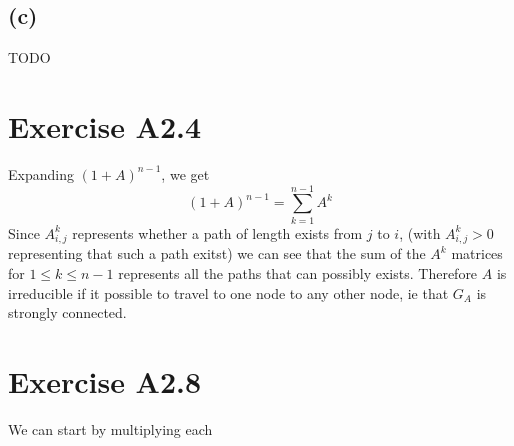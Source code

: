 \subsection*{(c)}
TODO
\section*{Exercise A2.4}
Expanding $(1+A)^{n-1}$, we get
$$
(1+A)^{n-1}=\sum_{k=1}^{n-1}A^k$$
Since $A^k_{i,j}$ represents whether a path of length exists from $j$ to $i$, (with $A^k_{i,j}>0$ representing that such a path exitst)
we can see that the sum of the $A^k$ matrices for $1\leq k \leq n-1$ represents all the paths that can possibly exists. Therefore $A$ is
irreducible if it possible to travel to one node to any other node, ie that $G_A$ is strongly connected.
\section*{Exercise A2.8}
We can start by multiplying each 
